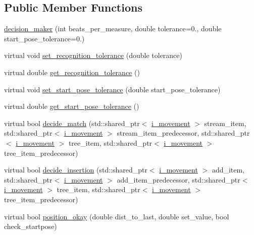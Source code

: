 \subsection*{Public Member Functions}
\begin{DoxyCompactItemize}
\item 
\hyperlink{classmae_1_1fl_1_1laban_1_1decision__maker_abf4796f881cd73c9b4406bb1b6c7a84f}{decision\-\_\-maker} (int beats\-\_\-per\-\_\-measure, double tolerance=0., double start\-\_\-pose\-\_\-tolerance=0.)
\item 
virtual void \hyperlink{classmae_1_1fl_1_1laban_1_1decision__maker_a7c83acb4810148453cee9f3098e89879}{set\-\_\-recognition\-\_\-tolerance} (double tolerance)
\item 
virtual double \hyperlink{classmae_1_1fl_1_1laban_1_1decision__maker_a3eb9245e5d7d34325051b91e8f20bd1b}{get\-\_\-recognition\-\_\-tolerance} ()
\item 
virtual void \hyperlink{classmae_1_1fl_1_1laban_1_1decision__maker_a93ac324bd228323cf0f1650dcd5f9f12}{set\-\_\-start\-\_\-pose\-\_\-tolerance} (double start\-\_\-pose\-\_\-tolerance)
\item 
virtual double \hyperlink{classmae_1_1fl_1_1laban_1_1decision__maker_ab3fadcd91ac85e52e8abeb8bdfe42bb4}{get\-\_\-start\-\_\-pose\-\_\-tolerance} ()
\item 
virtual bool \hyperlink{classmae_1_1fl_1_1laban_1_1decision__maker_aa620f89ab52dcfe3ceb7660898ae3988}{decide\-\_\-match} (std\-::shared\-\_\-ptr$<$ \hyperlink{classmae_1_1fl_1_1laban_1_1i__movement}{i\-\_\-movement} $>$ stream\-\_\-item, std\-::shared\-\_\-ptr$<$ \hyperlink{classmae_1_1fl_1_1laban_1_1i__movement}{i\-\_\-movement} $>$ stream\-\_\-item\-\_\-predecessor, std\-::shared\-\_\-ptr$<$ \hyperlink{classmae_1_1fl_1_1laban_1_1i__movement}{i\-\_\-movement} $>$ tree\-\_\-item, std\-::shared\-\_\-ptr$<$ \hyperlink{classmae_1_1fl_1_1laban_1_1i__movement}{i\-\_\-movement} $>$ tree\-\_\-item\-\_\-predecessor)
\item 
virtual bool \hyperlink{classmae_1_1fl_1_1laban_1_1decision__maker_ac1de2d370abf3d5ead61179eb5c318cc}{decide\-\_\-insertion} (std\-::shared\-\_\-ptr$<$ \hyperlink{classmae_1_1fl_1_1laban_1_1i__movement}{i\-\_\-movement} $>$ add\-\_\-item, std\-::shared\-\_\-ptr$<$ \hyperlink{classmae_1_1fl_1_1laban_1_1i__movement}{i\-\_\-movement} $>$ add\-\_\-item\-\_\-predecessor, std\-::shared\-\_\-ptr$<$ \hyperlink{classmae_1_1fl_1_1laban_1_1i__movement}{i\-\_\-movement} $>$ tree\-\_\-item, std\-::shared\-\_\-ptr$<$ \hyperlink{classmae_1_1fl_1_1laban_1_1i__movement}{i\-\_\-movement} $>$ tree\-\_\-item\-\_\-predecessor)
\item 
virtual bool \hyperlink{classmae_1_1fl_1_1laban_1_1decision__maker_af984822076ba7ef66bc54e1983366539}{position\-\_\-okay} (double dist\-\_\-to\-\_\-last, double set\-\_\-value, bool check\-\_\-startpose)
\end{DoxyCompactItemize}

